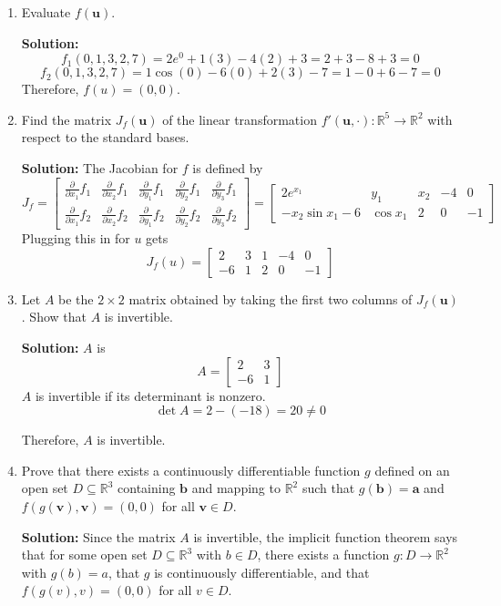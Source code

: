 \documentclass{report}
\newcommand{\solution}{\textbf{Solution: }}
\newcommand{\pdiv}[1]{\frac{\partial}{\partial #1}}
\begin{document}
\begin{enumerate}

	\medskip
	\item
	Evaluate $f(\mathbf{u})$.
	
	\solution 
	\[
		f_1(0, 1, 3, 2, 7) = 2e^0 + 1(3) - 4(2) + 3 = 2 + 3 - 8 + 3 = 0
	\]
	\[
		f_2(0, 1, 3, 2, 7) = 1\cos (0) - 6(0) + 2(3) - 7 = 1 - 0 + 6 - 7 = 0
	\]
	Therefore, $f(u) = (0, 0)$.
	\medskip
	\item
	Find the matrix $J_f(\mathbf{u})$ of the linear transformation 
	$f'(\mathbf{u},\cdot) \colon \mathbb{R}^5 \to \mathbb{R}^2$
	with respect to the standard bases.
	
	\solution
	The Jacobian for $f$ is defined by
	\[
		J_f = 
		\begin{bmatrix}
			\pdiv{x_1} f_1 & \pdiv {x_2} f_1 & \pdiv{y_1} f_1 & \pdiv{y_2} f_1 & \pdiv{y_3} f_1 \\
			\pdiv{x_1} f_2 & \pdiv {x_2} f_2 & \pdiv{y_1} f_2 & \pdiv{y_2} f_2 & \pdiv{y_3} f_2 
		\end{bmatrix} = 
		\begin{bmatrix}
			2e^{x_1} & y_1 & x_2 & -4 & 0 \\ 
			-x_2\sin x_1 -6 & \cos x_1 & 2 & 0 & -1
		\end{bmatrix}
	\]
	Plugging this in for $u$ gets 
	\[
		J_f(u) = 
		\begin{bmatrix}
			2 & 3 & 1 & -4 & 0 \\ 
		    -6 & 1 & 2 & 0 & -1
		\end{bmatrix}
	\]
	\medskip
	\item
	Let $A$ be the $2 \times 2$ matrix obtained by taking the first two 
	columns of $J_f(\mathbf{u})$. Show that $A$ is invertible.
	
	\solution
	$A$ is 
	\[
		A = 
		\begin{bmatrix}
			2 & 3 \\
			-6 & 1
		\end{bmatrix}
	\]
	$A$ is invertible if its determinant is nonzero. 
	\[
		\det A = 2 - (-18) = 20 \neq 0
	\]

	Therefore, $A$ is invertible.
	\medskip
	\item
	Prove that there exists a continuously differentiable function $g$ 
	defined on an open set $D \subseteq \mathbb{R}^3$ containing 
	$\mathbf{b}$ and mapping to $\mathbb{R}^2$ such that $g(\mathbf{b})=\mathbf{a}$
	and $f(g(\mathbf{v}),\mathbf{v})=(0,0)$ for all $\mathbf{v} \in D$.
	
	\solution
	Since the matrix $A$ is invertible,
	the implicit function theorem says that 
	for some open set $D \subseteq \mathbb{R}^3$ with $b \in D$,
	there exists a function 
	$g: D \to \mathbb{R}^2$ with $g(b) = a$,
	that $g$ is continuously differentiable,
	and that $f(g(v), v) = (0, 0)$ for all $v \in D$.


\end{enumerate}
\end{document}

